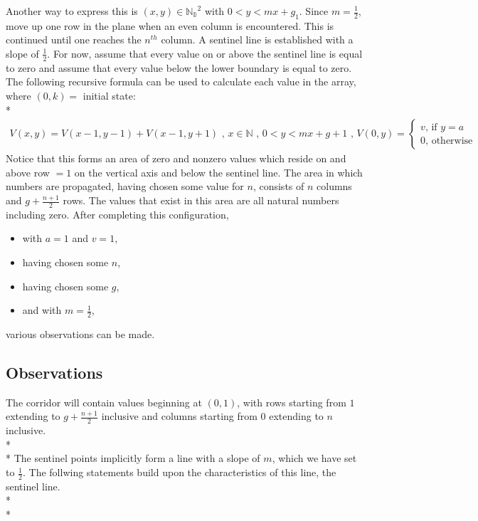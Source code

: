 \documentclass{article}
\newcommand*{\set}[1]{\mathbb{#1}}
\newcommand\tab[1][1cm]{\hspace*{#1}}
\begin{document}
Another way to express this is $(x,y) \in \set{N_0}^2$ with $0 < y < mx+g_1$. Since $m=\frac{1}{2}$, move up one row in the plane when an even column
is encountered. This is continued until one reaches the $n^{th}$ column. A sentinel line is
established with a slope of $\frac{1}{2}$. For now, assume that every value on or above the sentinel line 
is equal to zero and assume that every value below the lower boundary is equal to zero. The following recursive formula can be used to
calculate each value in the array, where $(0, k) = $ initial state:
\\*
\begin{align}
V(x,y) = V(x-1, y-1) + V(x-1,y+1)\text{ , }
x \in \set{N} \text{ , } 0 < y < mx+g+1\text{ , }
V(0,y) =  \begin{cases}
	v \text{, if }y=a\\
	0 \text{, otherwise}
	\end{cases}
\end{align}
Notice that this forms an area of zero and nonzero values which reside on and above row $= 1$ on the vertical axis and below the sentinel line.
The area in which numbers are propagated, having chosen some value for $n$, consists of $n$ columns and $g+ \frac{n+1}{2}$ rows.
The values
that exist in this area are all natural numbers including zero. After completing this configuration,
\begin{itemize}
 \item with $a = 1$ and $v = 1$,
 \item having chosen some $n$,
 \item having chosen some $g$,
 \item and with $m=\frac{1}{2}$,
\end{itemize}
various observations can be made.

\subsection*{Observations}
\tab The corridor will contain values beginning at $(0,1)$, with rows starting from $1$ extending to $g+ \frac{n+1}{2}$ inclusive and columns starting from $0$ extending to $n$ inclusive.
\\*\\*
\tab The sentinel points implicitly form a line with a slope of $m$, which we have set to $\frac{1}{2}$. The follwing statements build upon the characteristics of this line, the sentinel line.\\*\\*
\end{document}
